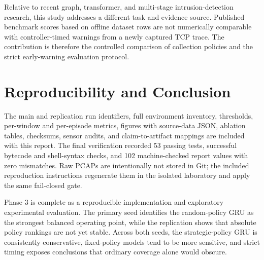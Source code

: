 \documentclass[10pt,a4paper]{article}
\begin{document}
Relative to recent graph, transformer, and multi-stage intrusion-detection research, this study addresses a different task and evidence source. Published benchmark scores based on offline dataset rows are not numerically comparable with controller-timed warnings from a newly captured TCP trace. The contribution is therefore the controlled comparison of collection policies and the strict early-warning evaluation protocol.

\section{Reproducibility and Conclusion}

The main and replication run identifiers, full environment inventory, thresholds, per-window and per-episode metrics, figures with source-data JSON, ablation tables, checksums, sensor audits, and claim-to-artifact mappings are included with this report. The final verification recorded 53 passing tests, successful bytecode and shell-syntax checks, and 102 machine-checked report values with zero mismatches. Raw PCAPs are intentionally not stored in Git; the included reproduction instructions regenerate them in the isolated laboratory and apply the same fail-closed gate.

Phase 3 is complete as a reproducible implementation and exploratory experimental evaluation. The primary seed identifies the random-policy GRU as the strongest balanced operating point, while the replication shows that absolute policy rankings are not yet stable. Across both seeds, the strategic-policy GRU is consistently conservative, fixed-policy models tend to be more sensitive, and strict timing exposes conclusions that ordinary coverage alone would obscure. 
\end{document}
